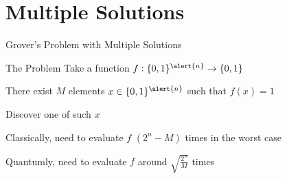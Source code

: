 \documentclass{beamer}
\begin{document}
\section{Multiple Solutions}

\begin{frame}{Grover's Problem with Multiple Solutions}

        \begin{block}{The Problem}
        Take a function $f : \{0,1\}^{\alert{n}} \to \{0,1\}$

        There exist $M$ elements $x \in \{0,1\}^{\alert{n}}$ such that $f(x) = 1$ 

        Discover one of such $x$  
        \end{block}

        Classically, need to evaluate $f$ $(2^n - M)$ times in the worst case 

        \pause
        Quantumly, need to evaluate $f$ around \alert{$\sqrt{\frac{2^n}{M}}$} times
\end{frame}
\end{document}
